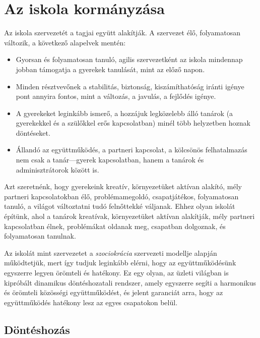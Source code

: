 \hypertarget{az-iskola-kormanyzasa}{%
\section{Az iskola kormányzása}\label{az-iskola-kormanyzasa}}

Az iskola szervezetét a tagjai együtt alakítják. A szervezet élő,
folyamatosan változik, a következő alapelvek mentén:

\begin{itemize}
\tightlist
\item
  Gyorsan és folyamatosan tanuló, agilis szervezetként az iskola
  mindennap jobban támogatja a gyerekek tanulását, mint az előző napon.
\item
  Minden résztvevőnek a stabilitás, biztonság, kiszámíthatóság iránti igénye
  pont annyira fontos, mint a változás, a javulás, a fejlődés igénye.
\item
  A gyerekeket leginkább ismerő, a hozzájuk legközelebb álló tanárok
  (a gyerekekkel és a szülőkkel erős kapcsolatban) minél több helyzetben
  hoznak döntéseket.
\item
  Állandó az együttműködés, a partneri kapcsolat, a kölcsönös
  felhatalmazás
  nem csak a tanár---gyerek kapcsolatban,
  hanem a tanárok és adminisztrátorok között is.
\end{itemize}

Azt szeretnénk, hogy gyerekeink kreatív, környezetüket aktívan alakító,
mély partneri kapcsolatokban élő, problémamegoldó, csapatjátékos,
folyamatosan tanuló, a világot változtatni tudó felnőttekké váljanak.
Ehhez olyan iskolát építünk, ahol a tanárok kreatívak, környezetüket
aktívan alakítják, mély partneri kapcsolatban élnek, problémákat oldanak
meg, csapatban dolgoznak, és folyamatosan tanulnak.

Az iskolát mint szervezetet a \emph{szociokrácia}
szervezeti modellje alapján működtetjük, mert így tudjuk leginkább elérni,
hogy az együttműködésünk egyszerre legyen
örömteli és hatékony. Ez egy
olyan, az üzleti világban is kipróbált dinamikus döntéshozatali
rendszer, amely egyszerre segíti a harmonikus és örömteli közösségi
együttműködést, és jelent garanciát arra, hogy az együttműködés hatékony
lesz az egyes csapatokon belül.

\hypertarget{donteshozas}{%
\subsection{Döntéshozás}\label{donteshozas}}


